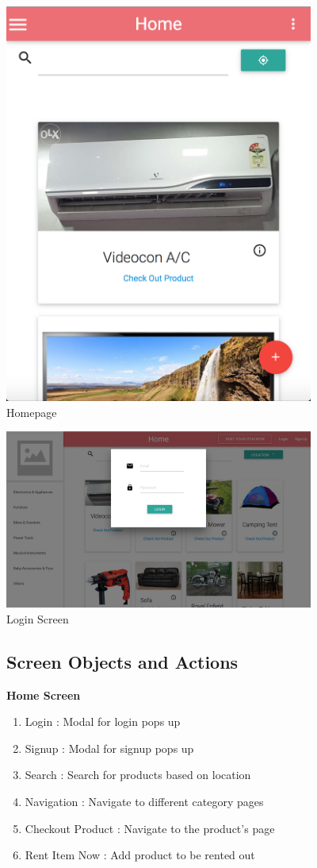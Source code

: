 \documentclass[11pt]{report}
\begin{document}
    \begin{figure}[h]
  \centering
    \includegraphics[width=4in]{homepage_mobile.png} 
	\caption{Homepage}
	\end{figure}
    \begin{figure}[h]
\vspace{0.5in}
  \centering
    \includegraphics[width=4in]{login.png} 
	\caption{Login Screen}
	\end{figure}
\begin{figure}[h]
\subsection{Screen Objects and Actions}
\textbf{Home Screen}
\begin{enumerate}
\item{Login : Modal for login pops up}
\item{Signup : Modal for signup pops up}
\item{Search : Search for products based on location}
\item{Navigation : Navigate to different category  pages}
\item{Checkout Product : Navigate to the product's page}
\item{Rent Item Now : Add product to be rented out}
\end{enumerate}
\end{figure}
\end{document}
